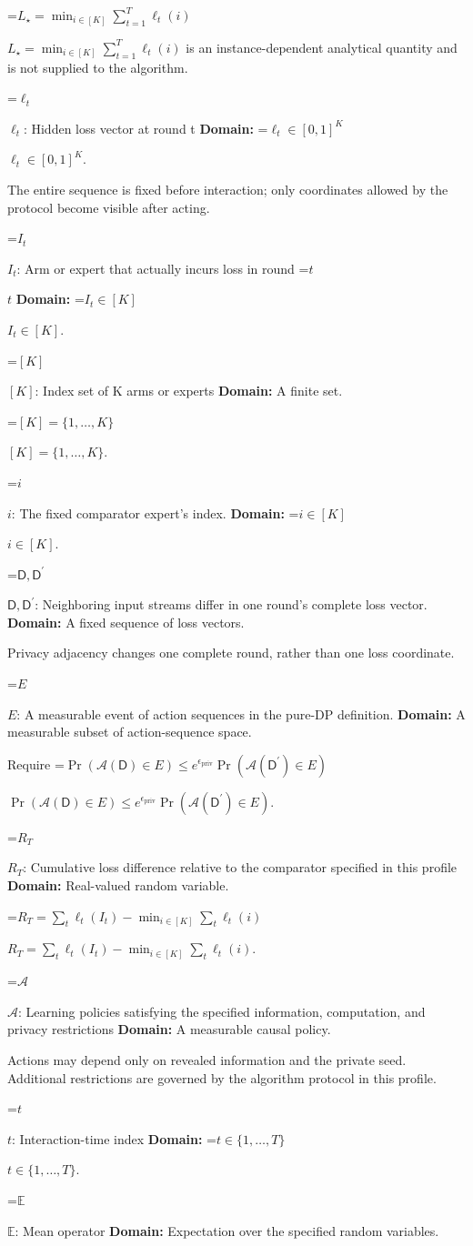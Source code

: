 \documentclass[10pt,a4paper]{article}
\newcommand{\AtlasMath}[1]{\par\begingroup\centering\setbox0=\hbox{$\displaystyle #1$}\ifdim\wd0>1.4\linewidth\typeout{ATLAS WIDE FORMULA: \the\wd0}\fi\ifdim\wd0>\linewidth\resizebox{\linewidth}{!}{\box0}\else\box0\fi\par\endgroup}
\newcommand{\AtlasInlineMath}[1]{\begingroup\setbox0=\hbox{$#1$}\ifdim\wd0>.4\linewidth\endgroup\AtlasMath{#1}\else\endgroup$#1$\fi}
\begin{document}
\AtlasInlineMath{L_\star=\min_{i\in[K]}\sum_{t=1}^T\ell_t(i)} is an instance-dependent analytical quantity and is not supplied to the algorithm.

\AtlasInlineMath{\ell_t}: Hidden loss vector at round t \textbf{Domain:} \AtlasInlineMath{\ell_t\in[0,1]^K}.

The entire sequence is fixed before interaction; only coordinates allowed by the protocol become visible after acting.

\AtlasInlineMath{I_t}: Arm or expert that actually incurs loss in round \AtlasInlineMath{t} \textbf{Domain:} \AtlasInlineMath{I_t\in[K]}.

\AtlasInlineMath{[K]}: Index set of K arms or experts \textbf{Domain:} A finite set.

\AtlasInlineMath{[K]=\{1,\ldots,K\}}.

\AtlasInlineMath{i}: The fixed comparator expert’s index. \textbf{Domain:} \AtlasInlineMath{i\in[K]}.

\AtlasInlineMath{\mathsf D,\mathsf D^{\prime}}: Neighboring input streams differ in one round's complete loss vector. \textbf{Domain:} A fixed sequence of loss vectors.

Privacy adjacency changes one complete round, rather than one loss coordinate.

\AtlasInlineMath{E}: A measurable event of action sequences in the pure-DP definition. \textbf{Domain:} A measurable subset of action-sequence space.

Require \AtlasInlineMath{\Pr(\mathcal A(\mathsf D)\in E)\le e^{\epsilon_{\mathrm{priv}}}\Pr(\mathcal A(\mathsf D^{\prime})\in E)}.

\AtlasInlineMath{R_T}: Cumulative loss difference relative to the comparator specified in this profile \textbf{Domain:} Real-valued random variable.

\AtlasInlineMath{R_T=\sum_t\ell_t(I_t)-\min_{i\in[K]}\sum_t\ell_t(i)}.

\AtlasInlineMath{\mathcal A}: Learning policies satisfying the specified information, computation, and privacy restrictions \textbf{Domain:} A measurable causal policy.

Actions may depend only on revealed information and the private seed. Additional restrictions are governed by the algorithm protocol in this profile.

\AtlasInlineMath{t}: Interaction-time index \textbf{Domain:} \AtlasInlineMath{t\in\{1,\ldots,T\}}.

\AtlasInlineMath{\mathbb E}: Mean operator \textbf{Domain:} Expectation over the specified random variables.
\end{document}

